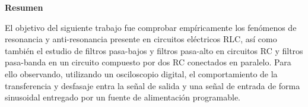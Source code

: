 \begin{titlepage}
\begin{center}
\large{\textbf{Resumen}}

\small{} %
El objetivo del siguiente trabajo fue comprobar empíricamente los fenómenos de resonancia y anti-resonancia presente en circuitos eléctricos RLC, así como también el estudio de filtros pasa-bajos y filtros pasa-alto en circuitos RC y filtros pasa-banda en un circuito compuesto por dos RC conectados en paralelo. Para ello observando, utilizando un osciloscopio digital, el comportamiento de la transferencia y desfasaje entra la señal de salida y una señal de entrada de forma sinusoidal entregado por un fuente de alimentación programable.


\end{center}



 

\vfill %

\end{titlepage}
%